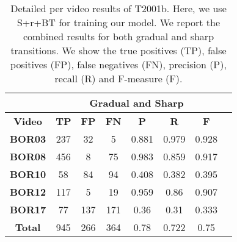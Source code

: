 \documentclass[journal]{IEEEtran}
\begin{document}
\begin{table}[h]
\centering
\begin{tabular}{|c|c|c|c|c|c|c|c|}
\hline
& \multicolumn{6}{c|}{\textbf{Gradual and Sharp}}  \\ \hline
\textbf{Video} & \textbf{TP} & \textbf{FP} & \textbf{FN} & \textbf{P} & \textbf{R} & \textbf{F} \\ \hline
\textbf{BOR03}     & 237         & 32          & 5           & 0.881      & 0.979      & 0.928      \\ \hline
\textbf{BOR08}     & 456         & 8           & 75          & 0.983      & 0.859      & 0.917      \\ \hline
\textbf{BOR10}     & 58          & 84          & 94          & 0.408      & 0.382      & 0.395      \\ \hline
\textbf{BOR12}     & 117         & 5           & 19          & 0.959      & 0.86       & 0.907      \\ \hline
\textbf{BOR17}     & 77          & 137         & 171         & 0.36       & 0.31       & 0.333      \\ \hline
\textbf{Total}     & 945         & 266         & 364         & 0.78       & 0.722      & 0.75       \\ \hline
\end{tabular}

\caption{Detailed per video results of T2001b. Here, we use S+r+BT for training our model. We report the combined results for both gradual and sharp transitions. We show the true positives (TP), false positives (FP), false negatives (FN), precision (P), recall (R) and F-measure (F).}
\label{2001b_07}
\end{table}
\end{document}
